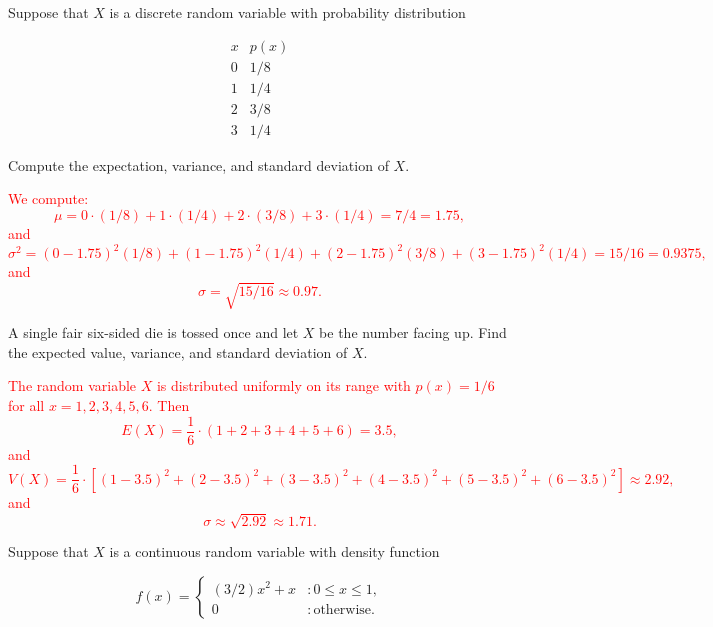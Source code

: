 \documentclass[12pt,reqno]{amsart}
\begin{document}
\bigskip
\prob Suppose that $X$ is a discrete random variable with probability distribution

	\[
	\begin{array}{c|c}
	x & p(x) \\ \hline
	0 & 1/8   \\
	1 & 1/4   \\
	2 & 3/8  \\
	3 & 1/4 
	\end{array}
	\]

Compute the expectation, variance, and standard deviation of $X$.

\bigskip
\textcolor{red}{We compute:
	\[
	\mu = 0\cdot(1/8) + 1 \cdot(1/4) + 2\cdot(3/8) + 3\cdot(1/4) = 7/4 = 1.75,
	\]
and
	\[
	\sigma^2 = (0-1.75)^2(1/8) + (1-1.75)^2(1/4) + (2-1.75)^2(3/8) + (3-1.75)^2(1/4) = 15/16 = 0.9375,
	\]
and
	\[
	\sigma = \sqrt{15/16} \approx 0.97.
	\]}



















\bigskip
\prob A single fair six-sided die is tossed once and let $X$ be the number facing up. Find the expected value, variance, and standard deviation of $X$.

\bigskip
\textcolor{red}{The random variable $X$ is distributed uniformly on its range with $p(x) = 1/6$ for all $x=1,2,3,4,5,6$. Then
	\[
	E(X) = \frac{1}{6} \cdot (1+2+3+4+5+6) = 3.5,
	\]
and
	\[
	V(X) = \frac{1}{6}\cdot \left[ (1-3.5)^2 + (2-3.5)^2 + (3-3.5)^2 + (4-3.5)^2 + (5-3.5)^2 + (6-3.5)^2\right] \approx 2.92,
	\]
and
	\[
	\sigma \approx \sqrt{2.92} \approx 1.71.
	\]}



















\bigskip
\prob Suppose that $X$ is a continuous random variable with density function
	
	\[
	f(x) = \begin{cases}
	(3/2)x^2 + x & : 0\leq x \leq 1, \\
	0 & : \text{otherwise}.
	\end{cases}
	\]
\end{document}
